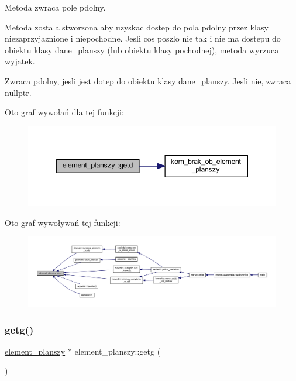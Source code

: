 Metoda zwraca pole pdolny.

Metoda zostala stworzona aby uzyskac dostep do pola pdolny przez klasy niezaprzyjaznione i niepochodne. Jesli cos poszlo nie tak i nie ma dostepu do obiektu klasy \mbox{\hyperlink{classdane__planszy}{dane\+\_\+planszy}} (lub obiektu klasy pochodnej), metoda wyrzuca wyjatek. \begin{DoxyReturn}{Zwraca}
pdolny, jesli jest dotep do obiektu klasy \mbox{\hyperlink{classdane__planszy}{dane\+\_\+planszy}}. Jesli nie, zwraca nullptr. 
\end{DoxyReturn}
Oto graf wywołań dla tej funkcji\+:
\nopagebreak
\begin{figure}[H]
\begin{center}
\leavevmode
\includegraphics[width=346pt]{classelement__planszy_a7721a78d1a2a879eccfa37b43e5a6be6_cgraph}
\end{center}
\end{figure}
Oto graf wywoływań tej funkcji\+:
\nopagebreak
\begin{figure}[H]
\begin{center}
\leavevmode
\includegraphics[width=350pt]{classelement__planszy_a7721a78d1a2a879eccfa37b43e5a6be6_icgraph}
\end{center}
\end{figure}
\mbox{\label{classelement__planszy_a4b0995862555562ac47fb3f57da610f8}} 
\subsubsection{\texorpdfstring{getg()}{getg()}}
{\footnotesize\ttfamily \mbox{\hyperlink{classelement__planszy}{element\+\_\+planszy}} $\ast$ element\+\_\+planszy\+::getg (\begin{DoxyParamCaption}{ }\end{DoxyParamCaption})}

